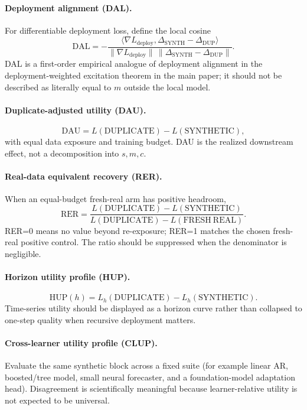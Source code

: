 \paragraph{Deployment alignment (DAL).}
For differentiable deployment loss, define the local cosine
\[
\mathrm{DAL}=-\frac{\langle\nabla L_{\mathrm{deploy}},\Delta_{\mathrm{SYNTH}}-\Delta_{\mathrm{DUP}}\rangle}
{\|\nabla L_{\mathrm{deploy}}\|\,\|\Delta_{\mathrm{SYNTH}}-\Delta_{\mathrm{DUP}}\|}.
\]
DAL is a first-order empirical analogue of deployment alignment in the deployment-weighted excitation theorem in the main paper; it should not be described as literally equal to $m$ outside the local model.

\paragraph{Duplicate-adjusted utility (DAU).}
\[
\mathrm{DAU}=L(\mathrm{DUPLICATE})-L(\mathrm{SYNTHETIC}),
\]
with equal data exposure and training budget. DAU is the realized downstream effect, not a decomposition into $s,m,c$.

\paragraph{Real-data equivalent recovery (RER).}
When an equal-budget fresh-real arm has positive headroom,
\[
\mathrm{RER}=\frac{L(\mathrm{DUPLICATE})-L(\mathrm{SYNTHETIC})}
{L(\mathrm{DUPLICATE})-L(\mathrm{FRESH\ REAL})}.
\]
RER=0 means no value beyond re-exposure; RER=1 matches the chosen fresh-real positive control. The ratio should be suppressed when the denominator is negligible.

\paragraph{Horizon utility profile (HUP).}
\[
\mathrm{HUP}(h)=L_h(\mathrm{DUPLICATE})-L_h(\mathrm{SYNTHETIC}).
\]
Time-series utility should be displayed as a horizon curve rather than collapsed to one-step quality when recursive deployment matters.

\paragraph{Cross-learner utility profile (CLUP).}
Evaluate the same synthetic block across a fixed suite (for example linear AR, boosted/tree model, small neural forecaster, and a foundation-model adaptation head). Disagreement is scientifically meaningful because learner-relative utility is not expected to be universal.

